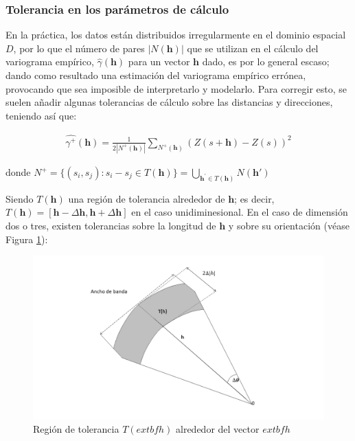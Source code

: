 \documentclass[
]{book}
\begin{document}
\hypertarget{tolerancia-en-los-paruxe1metros-de-cuxe1lculo}{%
\subsubsection*{Tolerancia en los parámetros de cálculo}\label{tolerancia-en-los-paruxe1metros-de-cuxe1lculo}}

En la práctica, los datos están distribuidos irregularmente en el dominio espacial \(D\), por lo que el número de pares \(|N(\textbf{h})|\) que se utilizan en el cálculo del variograma empírico, \(\hat{\gamma}(\textbf{h})\) para un vector \(\textbf{h}\) dado, es por lo general escaso; dando como resultado una estimación del variograma empírico errónea, provocando que sea imposible de interpretarlo y modelarlo. Para corregir esto, se suelen añadir algunas tolerancias de cálculo sobre las distancias y direcciones, teniendo así que:

\begin{align}
  \hat{\gamma^+}(\textbf{h})=\frac{1}{2|N^+(\textbf{h})|}\sum_{N^+(\textbf{h})}(Z(s+\textbf{h})-Z(s))^2  
\end{align}

donde \(N^+=\{(s_i,s_j): s_i-s_j\in T(\textbf{h})\}=\displaystyle \bigcup_{\textbf{h}^{'}\in T(\textbf{h})}N(\textbf{h}')\)

Siendo \(T(\textbf{h})\) una región de tolerancia alrededor de \(\textbf{h}\); es decir, \(T(\textbf{h})=[\textbf{h}-\Delta \textbf{h},\textbf{h}+\Delta \textbf{h}]\) en el caso unidiminesional. En el caso de dimensión dos o tres, existen tolerancias sobre la longitud de \(\textbf{h}\) y sobre su orientación \citep{emery} (véase Figura \ref{fig:regtol}):

\begin{figure}
\includegraphics[width=17.78in]{figuras/otros/tolerancia} \caption{Región de tolerancia $T( extbf{h})$ alrededor del vector $   extbf{h}$}\label{fig:regtol}
\end{figure}
\end{document}
